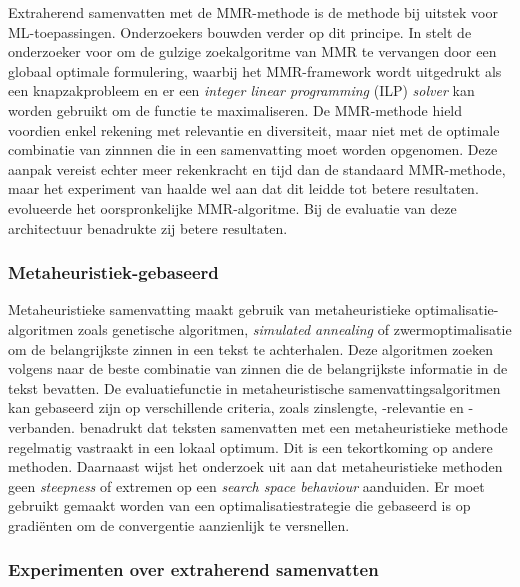 Extraherend samenvatten met de MMR-methode is de methode bij uitstek voor ML-toepassingen. Onderzoekers bouwden verder op dit principe. In \textcite{McDonald2007} stelt de onderzoeker voor om de gulzige zoekalgoritme van MMR te vervangen door een globaal optimale formulering, waarbij het MMR-framework wordt uitgedrukt als een knapzakprobleem en er een \textit{integer linear programming} (ILP) \textit{solver} kan worden gebruikt om de functie te maximaliseren. De MMR-methode hield voordien enkel rekening met relevantie en diversiteit, maar niet met de optimale combinatie van zinnnen die in een samenvatting moet worden opgenomen. Deze aanpak vereist echter meer rekenkracht en tijd dan de standaard MMR-methode, maar het experiment van \textcite{McDonald2007} haalde wel aan dat dit leidde tot betere resultaten. \textcite{Lin2010} evolueerde het oorspronkelijke MMR-algoritme. Bij de evaluatie van deze architectuur benadrukte zij betere resultaten. 

\subsubsection{Metaheuristiek-gebaseerd}

Metaheuristieke samenvatting maakt gebruik van metaheuristieke optimalisatie-algoritmen zoals genetische algoritmen, \textit{simulated annealing} of zwermoptimalisatie om de belangrijkste zinnen in een tekst te achterhalen. Deze algoritmen zoeken volgens \textcite{Verma2020, Premjith2015} naar de beste combinatie van zinnen die de belangrijkste informatie in de tekst bevatten. De evaluatiefunctie in metaheuristische samenvattingsalgoritmen kan gebaseerd zijn op verschillende criteria, zoals zinslengte, -relevantie en -verbanden. \textcite{Rani2021} benadrukt dat teksten samenvatten met een metaheuristieke methode regelmatig vastraakt in een lokaal optimum. Dit is een tekortkoming op andere methoden. Daarnaast wijst het onderzoek uit aan dat metaheuristieke methoden geen \textit{steepness} of extremen op een \textit{search space behaviour} aanduiden. Er moet gebruikt gemaakt worden van een optimalisatiestrategie die gebaseerd is op gradiënten om de convergentie aanzienlijk te versnellen.


\subsubsection{Experimenten over extraherend samenvatten}


